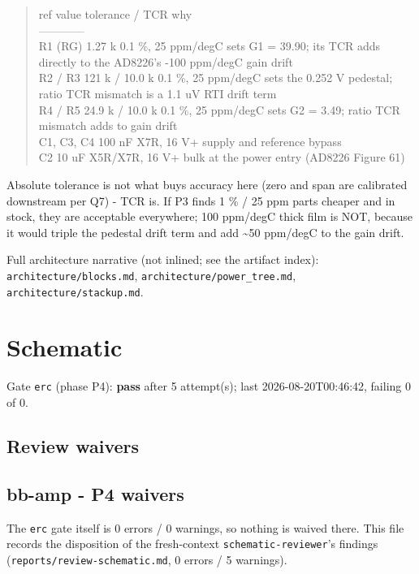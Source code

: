 \documentclass[11pt,a4paper]{article}
\begin{document}
\begin{quote}\small\ttfamily\raggedright
\textbar{} ref \textbar{} value \textbar{} tolerance / TCR \textbar{} why \textbar{}\\
\textbar{}---\textbar{}---\textbar{}---\textbar{}---\textbar{}\\
\textbar{} R1 (RG) \textbar{} 1.27 k \textbar{} 0.1 \%, 25 ppm/degC \textbar{} sets G1 = 39.90; its TCR adds directly to the AD8226's -100 ppm/degC gain drift \textbar{}\\
\textbar{} R2 / R3 \textbar{} 121 k / 10.0 k \textbar{} 0.1 \%, 25 ppm/degC \textbar{} sets the 0.252 V pedestal; ratio TCR mismatch is a 1.1 uV RTI drift term \textbar{}\\
\textbar{} R4 / R5 \textbar{} 24.9 k / 10.0 k \textbar{} 0.1 \%, 25 ppm/degC \textbar{} sets G2 = 3.49; ratio TCR mismatch adds to gain drift \textbar{}\\
\textbar{} C1, C3, C4 \textbar{} 100 nF \textbar{} X7R, 16 V+ \textbar{} supply and reference bypass \textbar{}\\
\textbar{} C2 \textbar{} 10 uF \textbar{} X5R/X7R, 16 V+ \textbar{} bulk at the power entry (AD8226 Figure 61) \textbar{}
\end{quote}
Absolute tolerance is not what buys accuracy here (zero and span are calibrated downstream per Q7) - TCR is. If P3 finds 1 \% / 25 ppm parts cheaper and in stock, they are acceptable everywhere; 100 ppm/degC thick film is NOT, because it would triple the pedestal drift term and add \textasciitilde{}50 ppm/degC to the gain drift.

Full architecture narrative (not inlined; see the artifact index): \texttt{architecture/blocks.md}, \texttt{architecture/power\_tree.md}, \texttt{architecture/stackup.md}.
\section{Schematic}
Gate \texttt{erc} (phase P4): \textbf{pass} after 5 attempt(s); last 2026-08-20T00:46:42, failing 0 of 0.
\subsection*{Review waivers}
\subsection*{bb-amp - P4 waivers}
The \texttt{erc} gate itself is 0 errors / 0 warnings, so nothing is waived there. This file records the disposition of the fresh-context \texttt{schematic-reviewer}'s findings (\texttt{reports/review-schematic.md}, 0 errors / 5 warnings).
\end{document}

